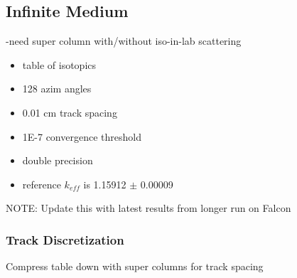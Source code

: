 \subsection{Infinite Medium}
\label{subsec:chap4-inf-medium}

-need super column with/without iso-in-lab scattering

\begin{itemize}
\item table of isotopics
\item 128 azim angles
\item 0.01 cm track spacing
\item 1E-7 convergence threshold
\item double precision
\item reference $k_{eff}$ is 1.15912 $\pm$ 0.00009
\end{itemize}

NOTE: Update this with latest results from longer run on Falcon


\subsubsection{Track Discretization}
\label{subsubsec:chap4-inf-medium-tracks}

Compress table down with super columns for track spacing

